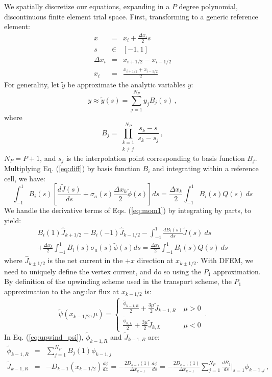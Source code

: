 \documentclass[11pt]{article}
\newcommand{\benum}{\begin{equation}}
\newcommand{\eenum}{\end{equation}}
\newcommand{\be}{\begin{equation*}}
\newcommand{\ee}{\end{equation*}}
\newcommand{\bea}{\begin{eqnarray*}}
\newcommand{\eea}{\end{eqnarray*}}
\newcommand{\beanum}{\begin{eqnarray}}
\newcommand{\eeanum}{\end{eqnarray}}
\newcommand{\eqt}[1]{Eq. (\ref{#1})}
\newcommand{\eqts}[1]{Eqs. (\ref{#1})}
\newcommand{\B}[1]{\ensuremath{{B_{#1} }}}
\newcommand{\p}{\ensuremath{ d}}
\newcommand{\PT}{\ensuremath{\widetilde{\phi}(s) }}
\newcommand{\pec}{\, ,}
\newcommand{\pep}{\, .}
\begin{document}
We spatially discretize our equations, expanding in a $P$ degree polynomial, discontinuous finite element trial space.  
First, transforming to a generic reference element:
\bea
x &=& x_i + \frac{\Delta x_i}{2} s \\
s &\in& [-1,1] \\
\Delta x_i &=& x_{i+1/2} - x_{i-1/2} \\
x_i &=& \frac{x_{i+1/2} + x_{i-1/2}}{2}
\eea
For generality, let $\widetilde{y}$ be approximate the analytic variables $y$:
\be
y \approx   \widetilde{y}(s) = \sum_{j=1}^{N_P}{y_j\B{j}(s) } \pec
\ee
where
\be
\B{j} = \prod_{\substack{k=1 \\ k\neq j}}^{N_P}{ \frac{s_k - s}{s_k - s_j}} \pec
\ee
$N_P = P+1$, and $s_j$ is the interpolation point corresponding to basis function \B{j}.
Multiplying \eqt{eq:diff} by basis function \B{i} and integrating within a reference cell, we have:
\benum
\label{eq:mom1}
\int_{-1}^{1}{\B{i}(s) \left[\frac{\p \widetilde{J}(s)}{\p s}  + \sigma_a(s) \frac{\Delta x_k}{2}\widetilde{\phi}(s) \right]ds } = 
\frac{\Delta x_k}{2}\int_{-1}^1{\B{i}(s) Q(s)~ds} 
\eenum
We handle the derivative terms of \eqts{eq:mom1} by integrating by parts, to yield:
\begin{multline}
\B{i}(1)\widehat{J}_{k+1/2} - \B{i}(-1)\widehat{J}_{k-1/2} - 
\int_{-1}^{1}{ \frac{\p \B{i}(s)}{\p s} \widetilde{J}(s)~ds} \\
 + \frac{\Delta x_k}{2}\int_{-1}^1{\B{i}(s)\sigma_a(s) \PT ds } = 
\frac{\Delta x_k}{2}\int_{-1}^1{\B{i}(s) Q(s)~ds} 
\label{eq:mom2}
\end{multline}
where $\widehat{J}_{k\pm1/2}$ is the net current in the $+x$ direction at $x_{k\pm1/2}$.  With DFEM, we need to uniquely define the vertex current, and do so using the $P_1$ approximation.  By definition of the upwinding scheme used in the transport scheme, the $P_1$ approximation to the angular flux at $x_{k-1/2}$ is:
\benum
\widetilde{\psi}(x_{k-1/2},\mu) = \left \{ \begin{array}{ll}
\frac{\widetilde{\phi}_{k-1,R}}{2} + \frac{3\mu}{2}\widetilde{J}_{k-1,R} & ~\mu>0 \\
\frac{\widetilde{\phi}_{k,L}}{2} + \frac{3\mu}{2}\widetilde{J}_{k,L}& ~\mu<0
\end{array}
\right. 
\pep
\label{eq:upwind_psi}
\eenum
In \eqt{eq:upwind_psi}, $\widetilde{\phi}_{k-1,R}$ and $\widetilde{J}_{k-1,R}$ are:
\begin{subequations}
\label{eq:int_1}
\beanum
\widetilde{\phi}_{k-1,R} &=& \sum_{j=1}^{N_P}{ \B{j}(1) \phi_{k-1,j} } \\
\widetilde{J}_{k-1,R} &=& -D_{k-1}(x_{k-1/2}) \frac{\p \phi}{\p x} = -\frac{2D_{k-1}(1)}{\Delta x_{k-1}}\frac{\p \phi}{\p s} = -\frac{2D_{k-1}(1)}{\Delta x_{k-1}} \sum_{j=1}^{N_P}{ \frac{\p \B{j}}{\p s} \bigg \lvert_{s=1} \phi_{k-1,j} } \pec 
\eeanum
\end{subequations}
\end{document}
